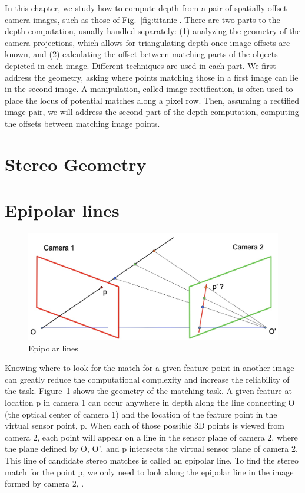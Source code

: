  In this chapter, we study how to compute depth from a pair of spatially offset camera images, such as those of Fig.~\ref{fig:titanic}.  There are two parts to the depth computation, usually handled separately:  (1) analyzing the geometry of the camera projections, which allows for triangulating depth once image offsets are known, and (2) calculating the offset between matching parts of the objects depicted in each image.  Different techniques are used in each part.  We first address the geometry, asking where points matching those in a first image can lie in the second image. A manipulation, called image rectification, is often used to place the locus of potential matches along a pixel row.  Then, assuming a rectified image pair, we will address the second part of the depth computation, computing the offsets between matching image points.

\section{Stereo Geometry}

\section{Epipolar lines}
\label{sect:epipolar}
\begin{figure}
\centerline{
\includegraphics[width=0.8\linewidth]{figures/stereo/epipolar.jpg}
}
\caption{Epipolar lines}
\label{fig:epipolar}
\end{figure}

Knowing where to look for the match for a given feature point in another image can greatly reduce the computational complexity and increase the reliability of the task.  Figure~\ref{fig:epipolar} shows the geometry of the matching task.  A given feature at location p in camera 1 can occur anywhere in depth along the line connecting O (the optical center of camera 1) and the location of the feature point in the virtual sensor point, p.  When each of those possible 3D points is viewed from camera 2, each point will appear on a line in the sensor plane of camera 2, where the plane defined by O, O', and p  intersects the virtual sensor plane of camera 2. This line of candidate stereo matches 
 is called an epipolar line.   To find the stereo match for the point p, we only need to look along the  epipolar line in the image formed by camera 2, \cite{Hartley2004}.

